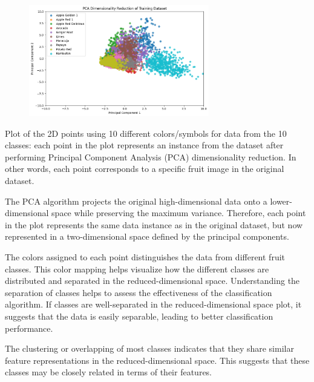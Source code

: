 \documentclass[a4paper,10 pt]{article}
\begin{document}
  \vspace{12pt}


\begin{figure}[H]
    \centering
    \includegraphics[width=0.7\textwidth]{Q3f.png} %
  \end{figure}
  
  \vspace{12pt}

Plot of the 2D points using 10 different colors/symbols for data from the 10 classes: each point in the plot represents an instance from the dataset after performing Principal Component Analysis (PCA) dimensionality reduction. In other words, each point corresponds to a specific fruit image in the original dataset.
\vspace{12pt}

The PCA algorithm projects the original high-dimensional data onto a lower-dimensional space while preserving the maximum variance. Therefore, each point in the plot represents the same data instance as in the original dataset, but now represented in a two-dimensional space defined by the principal components.
\vspace{12pt}

The colors assigned to each point distinguishes the data from different fruit classes. This color mapping helps visualize how the different classes are distributed and separated in the reduced-dimensional space. Understanding the separation of classes helps to assess the effectiveness of the classification algorithm. If classes are well-separated in the reduced-dimensional space plot, it suggests that the data is easily separable, leading to better classification performance.

\vspace{12pt}

The clustering or overlapping of most classes indicates that they share similar feature representations in the reduced-dimensional space. This suggests that these classes may be closely related in terms of their features.
\vspace{12pt}
\end{document}
